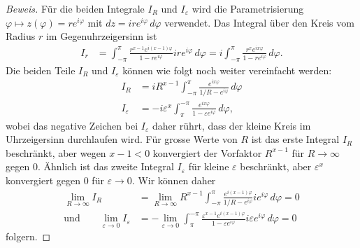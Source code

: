 \begin{proof}[Beweis]
Für die beiden Integrale $I_R$ und $I_\varepsilon$ wird die Parametrisierung
$\varphi\mapsto z(\varphi) = re^{i\varphi}$ mit $dz=ire^{i\varphi}\,d\varphi$
verwendet.
Das Integral über den Kreis vom Radius $r$ im Gegenuhrzeigersinn ist
\begin{align*}
I_r
&=
\int_{-\pi}^\pi
\frac{r^{x-1}e^{i(x-1)\varphi}}{1-re^{i\varphi}} ire^{i\varphi}\,d\varphi
=
i\int_{-\pi}^\pi
\frac{r^xe^{ix\varphi}}{1-re^{i\varphi}}
\,d\varphi.
\end{align*}
Die beiden Teile $I_R$ und $I_\varepsilon$ können wie folgt noch
weiter vereinfacht werden:
\begin{align*}
I_R
&=
iR^{x-1}
\int_{-\pi}^\pi
\frac{e^{ix\varphi}}{1/R-e^{i\varphi}}
\,d\varphi
\\
I_{\varepsilon}
&=
-
i
\varepsilon^x
\int_{\pi}^{-\pi}
\frac{e^{ix\varphi}}{1-\varepsilon e^{i\varphi}}
\,d\varphi,
\end{align*}
wobei das negative Zeichen bei $I_\varepsilon$ daher rührt, dass der
kleine Kreis im Uhrzeigersinn durchlaufen wird.
Für grosse Werte von $R$ ist das erste Integral $I_R$ beschränkt, aber wegen
$x-1<0$ konvergiert der Vorfaktor $R^{x-1}$ für $R\to\infty$ gegen 0.
Ähnlich ist das zweite Integral $I_\varepsilon$ für kleine $\varepsilon$
beschränkt, aber $\varepsilon^x$ konvergiert gegen $0$ für  $\varepsilon\to 0$.
Wir können daher
\begin{align*}
\lim_{R\to\infty}
I_R
&=
\lim_{R\to\infty}
R^{x-1}
\int_{-\pi}^\pi
\frac{e^{i(x-1)\varphi}}{1/R-e^{i\varphi}}
ie^{i\varphi}
\,d\varphi
=0
\\
\text{und}
\qquad
\lim_{\varepsilon\to 0}
I_\varepsilon
&=
-
\lim_{\varepsilon\to 0}
\int_{\pi}^{-\pi}
\frac{\varepsilon^{x-1}e^{i(x-1)\varphi}}{1-\varepsilon e^{i\varphi}}
i\varepsilon e^{i\varphi}
\,d\varphi
=
0
\end{align*}
folgern.


\end{proof}
